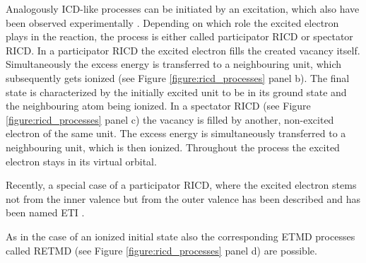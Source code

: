 Analogously ICD-like
processes can be initiated by an excitation, which also have been observed
experimentally \cite{Barth05,Gokhberg06,Kopelke09}.
Depending on which role the excited
electron plays in the reaction, the process is either called participator \ac{RICD}
or spectator \ac{RICD}.
In a participator \ac{RICD} the excited electron fills the created vacancy itself.
Simultaneously the excess energy is transferred to a neighbouring unit, which
subsequently gets ionized (see Figure \ref{figure:ricd_processes} panel b).
The final state is characterized
by the initially excited unit to be in its ground state and the neighbouring atom
being ionized.
In a spectator \ac{RICD} (see Figure \ref{figure:ricd_processes} panel c)
the vacancy is filled by another, non-excited electron
of the same unit. The excess energy is simultaneously transferred to a neighbouring
unit, which is then ionized. Throughout the process the excited electron stays
in its virtual orbital.

Recently, a special case of a participator \ac{RICD}, where the excited
electron stems not from the inner valence but from the outer valence
has been described and has been named \ac{ETI} \cite{Kopelke11}.

As in the case of an ionized initial state also the corresponding ETMD processes
called RETMD (see Figure \ref{figure:ricd_processes} panel d) are possible.



